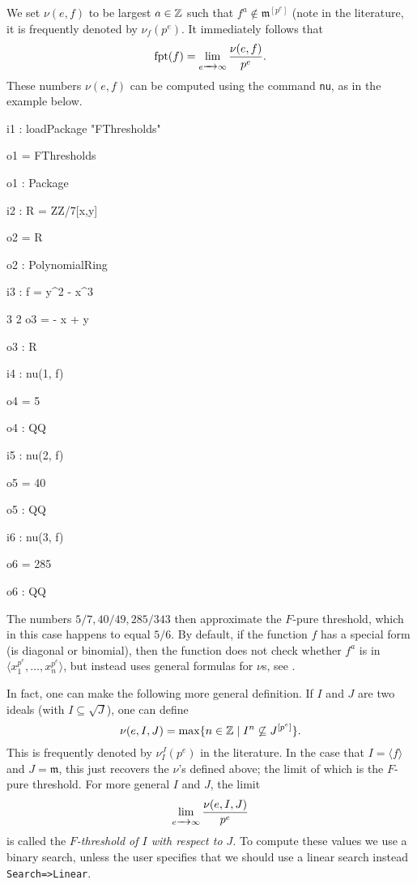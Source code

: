 \documentclass{amsart}
\newcommand{\fram}{\mathfrak{m}}
\begin{document}
We set $\nu(e, f)$ to be largest $a \in \bZ$ such that $f^a \notin \fram^{[p^e]}$ (note in the literature, it is frequently denoted by $\nu_f(p^e)$.  It immediately follows that 
\[
\fpt(f) = \lim_{e \to \infty} {\nu(e, f) \over p^e}.
\]
These numbers $\nu(e, f)$ can be computed using the command {\tt nu}, as in the example below.  
\medskip
{\small
{}
\begin{MyVerbatim}
i1 : loadPackage "FThresholds"

o1 = FThresholds

o1 : Package

i2 : R = ZZ/7[x,y]

o2 = R

o2 : PolynomialRing

i3 : f = y^2 - x^3

        3    2
o3 = - x  + y

o3 : R

i4 : nu(1, f)

o4 = 5

o4 : QQ

i5 : nu(2, f)

o5 = 40

o5 : QQ

i6 : nu(3, f)

o6 = 285

o6 : QQ
\end{MyVerbatim}
}
\medskip
The numbers $5/7, 40/49, 285/343$ then approximate the $F$-pure threshold, which in this case happens to equal $5/6$.  By default, if the function $f$ has a special form (is diagonal or binomial), then the function does not check whether $f^a$ is in  $\langle x_1^{p^e}, \dots, x_n^{p^e} \rangle$, but instead uses general formulas for $\nu$s, see \cite{HernandezFPureThresholdOfBinomial,HernandezFInvariantsOfDiagonalHyp}.

In fact, one can make the following more general definition.  If $I$ and $J$ are two ideals (with $I \subseteq \sqrt{J}$), one can define
\[
\nu(e, I, J) = \max \{ n \in \bZ \; |\; I^n \not\subseteq J^{[p^e]} \}.
\]
This is frequently denoted by $\nu_I^J(p^e)$ in the literature.  In the case that $I = \langle f \rangle$ and $J = \fram$, this just recovers the $\nu$'s defined above; the limit of which is the $F$-pure threshold.  For more general $I$ and $J$, the limit
\[
\lim_{e \to \infty} {\nu(e, I, J) \over p^e}
\]
is called the \emph{$F$-threshold of $I$ with respect to $J$}.  To compute these values we use a binary search, unless the user specifies that we should use a linear search instead {\tt Search=>Linear}.  
\end{document}
